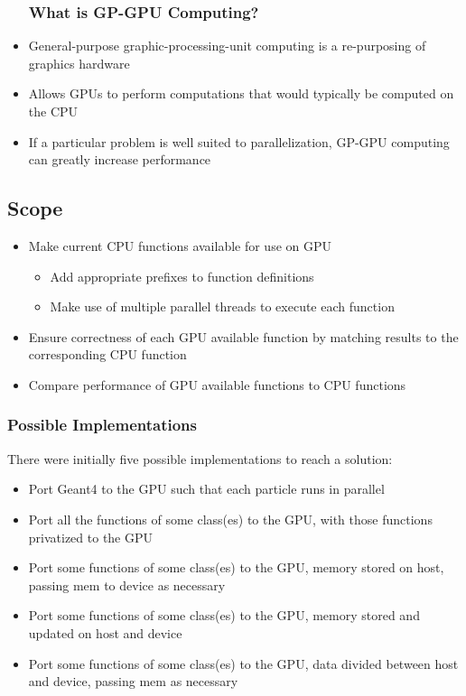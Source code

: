 \documentclass{beamer}
\begin{document}
\begin{frame}
\begin{itemize}
\frametitle{What is GP-GPU Computing?}
\item General-purpose graphic-processing-unit computing is a re-purposing of graphics hardware
\item Allows GPUs  to perform computations that would typically be computed on the CPU
\item If a particular problem is well suited to parallelization, GP-GPU computing can greatly increase performance
\end{itemize}
\end{frame}

\subsection{Scope}
\begin{frame}
\begin{itemize}
\frametitle{Scope}
\item Make current CPU functions available for use on GPU
\begin{itemize}
\item Add appropriate prefixes to function definitions
\item Make use of multiple parallel threads to execute each function
\end{itemize}
\item Ensure correctness of each GPU available function by matching results to the corresponding CPU function
\item Compare performance of GPU available functions to CPU functions
\end{itemize}
\end{frame}

\begin{frame}
\frametitle{Possible Implementations}
There were initially five possible implementations to reach 
a solution:
\begin{itemize}
\item Port Geant4 to the GPU such that each particle runs in parallel
\item Port all the functions of some class(es) to the GPU, with those functions privatized to the GPU
\item Port some functions of some class(es) to the GPU, memory stored on host, passing mem to device as necessary
\item Port some functions of some class(es) to the GPU, memory stored and updated on host and device
\item Port some functions of some class(es) to the GPU, data divided between host and device, passing mem as necessary
\end{itemize}
\end{frame}
\end{document}
